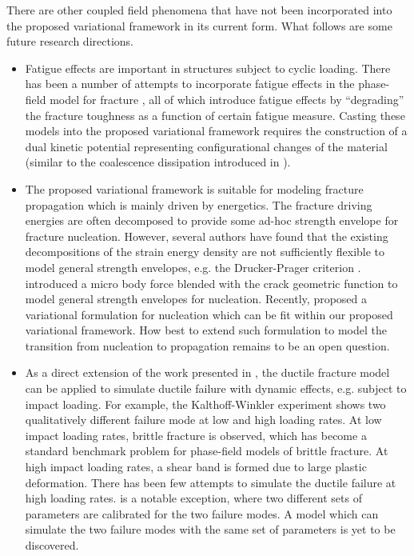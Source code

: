 There are other coupled field phenomena that have not been incorporated into the proposed variational framework in its current form. What follows are some future research directions.
\begin{itemize}
  \item Fatigue effects are important in structures subject to cyclic loading. There has been a number of attempts to incorporate fatigue effects in the phase-field model for fracture \cite{seiler2020efficient,mesgarnejad2019phase,alessi2018phenomenological,lo2019phase}, all of which introduce fatigue effects by ``degrading'' the fracture toughness as a function of certain fatigue measure. Casting these models into the proposed variational framework requires the construction of a dual kinetic potential representing configurational changes of the material (similar to the coalescence dissipation introduced in ).
  \item The proposed variational framework is suitable for modeling fracture propagation which is mainly driven by energetics. The fracture driving energies are often decomposed to provide some ad-hoc strength envelope for fracture nucleation. However, several authors have found that the existing decompositions of the strain energy density are not sufficiently flexible to model general strength envelopes, e.g. the Drucker-Prager criterion \cite{tanne2018crack,kumar2020revisiting}. \citet{kumar2020revisiting} introduced a micro body force blended with the crack geometric function to model general strength envelopes for nucleation. Recently, \citet{de2021nucleation} proposed a variational formulation for nucleation which can be fit within our proposed variational framework. How best to extend such formulation to model the transition from nucleation to propagation remains to be an open question.
  \item As a direct extension of the work presented in , the ductile fracture model can be applied to simulate ductile failure with dynamic effects, e.g. subject to impact loading. For example, the Kalthoff-Winkler experiment \cite{kalthoff1988failure} shows two qualitatively different failure mode at low and high loading rates. At low impact loading rates, brittle fracture is observed, which has become a standard benchmark problem for phase-field models of brittle fracture. At high impact loading rates, a shear band is formed due to large plastic deformation. There has been few attempts to simulate the ductile failure at high loading rates. \cite{ulmer2013phase} is a notable exception, where two different sets of parameters are calibrated for the two failure modes. A model which can simulate the two failure modes with the same set of parameters is yet to be discovered.

\end{itemize}
